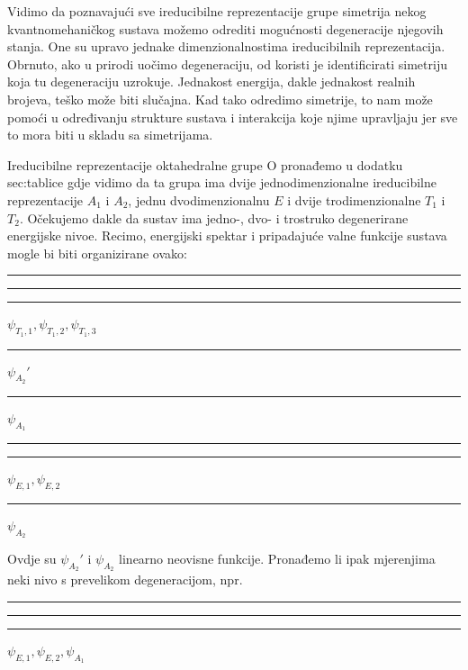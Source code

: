 Vidimo da poznavajući sve ireducibilne reprezentacije grupe simetrija nekog
kvantnomehaničkog
sustava možemo odrediti mogućnosti degeneracije njegovih stanja.
One su upravo jednake dimenzionalnostima ireducibilnih reprezentacija.
Obrnuto, ako u prirodi uočimo degeneraciju, od koristi je identificirati
simetriju koja tu degeneraciju uzrokuje. Jednakost energija, dakle jednakost
realnih brojeva, teško može biti slučajna. Kad tako odredimo simetrije,
to nam može pomoći u određivanju strukture sustava i interakcija koje
njime upravljaju jer sve to mora biti u skladu sa simetrijama.

\begin{primjer}

Ireducibilne reprezentacije oktahedralne grupe O pronađemo
u dodatku {sec:tablice} gdje vidimo 
da ta grupa ima dvije jednodimenzionalne
ireducibilne reprezentacije $A_1$ i $A_2$, jednu
dvodimenzionalnu $E$ i dvije trodimenzionalne $T_1$ i  $T_2$.
Očekujemo dakle da sustav ima jedno-, dvo- i trostruko degenerirane
energijske nivoe.
Recimo, energijski spektar i pripadajuće valne funkcije sustava mogle
bi biti organizirane ovako:

\hspace*{2cm}
\rule{3cm}{1pt}\hspace*{-3cm}%
\rule[2pt]{3cm}{1pt}\hspace*{-3cm}%
\rule[4pt]{3cm}{1pt}\hspace{12pt}%
$\psi_{T_1,1}, \psi_{T_1,2}, \psi_{T_1,3}$

\hspace*{2cm}
\rule{3cm}{1pt}\hspace*{12pt}%
$\psi_{A_2}'$

\hspace*{2cm}
\rule{3cm}{1pt}\hspace*{12pt}%
$\psi_{A_1}$

\hspace*{2cm}
\rule{3cm}{1pt}\hspace*{-3cm}%
\rule[2pt]{3cm}{1pt}\hspace*{12pt}%
$\psi_{E,1}, \psi_{E,2}$

\hspace*{2cm}
\rule{3cm}{1pt}\hspace*{12pt}%
$\psi_{A_2}$

Ovdje su $\psi_{A_2}'$ i $\psi_{A_2}$ linearno neovisne funkcije.
Pronađemo li ipak mjerenjima neki nivo s prevelikom degeneracijom,
npr.

\hspace*{2cm}
\rule{3cm}{1pt}\hspace*{-3cm}%
\rule[2pt]{3cm}{1pt}\hspace*{-3cm}%
\rule[4pt]{3cm}{1pt}\hspace{12pt}%
$\psi_{E,1}, \psi_{E,2}, \psi_{A_1}$


\end{primjer}
